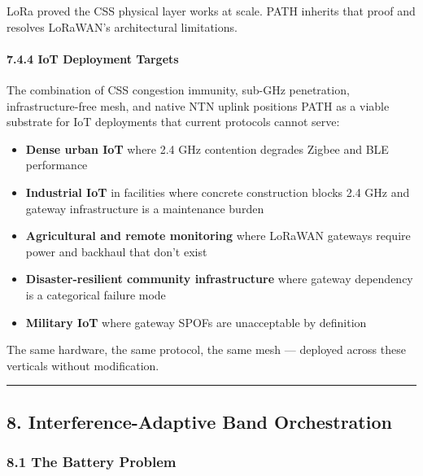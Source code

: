 \documentclass[
  11pt,
]{article}
\providecommand{\tightlist}{%
  \setlength{\itemsep}{0pt}\setlength{\parskip}{0pt}}
\begin{document}
LoRa proved the CSS physical layer works at scale. PATH inherits that
proof and resolves LoRaWAN's architectural limitations.

\hypertarget{iot-deployment-targets}{%
\paragraph{7.4.4 IoT Deployment Targets}\label{iot-deployment-targets}}

The combination of CSS congestion immunity, sub-GHz penetration,
infrastructure-free mesh, and native NTN uplink positions PATH as a
viable substrate for IoT deployments that current protocols cannot
serve:

\begin{itemize}
\tightlist
\item
  \textbf{Dense urban IoT} where 2.4 GHz contention degrades Zigbee and
  BLE performance
\item
  \textbf{Industrial IoT} in facilities where concrete construction
  blocks 2.4 GHz and gateway infrastructure is a maintenance burden
\item
  \textbf{Agricultural and remote monitoring} where LoRaWAN gateways
  require power and backhaul that don't exist
\item
  \textbf{Disaster-resilient community infrastructure} where gateway
  dependency is a categorical failure mode
\item
  \textbf{Military IoT} where gateway SPOFs are unacceptable by
  definition
\end{itemize}

The same hardware, the same protocol, the same mesh --- deployed across
these verticals without modification.

\begin{center}\rule{0.5\linewidth}{0.5pt}\end{center}

\hypertarget{interference-adaptive-band-orchestration}{%
\subsection{8. Interference-Adaptive Band
Orchestration}\label{interference-adaptive-band-orchestration}}

\hypertarget{the-battery-problem}{%
\subsubsection{8.1 The Battery Problem}\label{the-battery-problem}}
\end{document}
